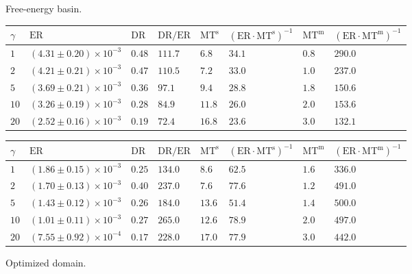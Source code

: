 \documentclass[a4]{article}
\newcommand{\DR}{\mathrm{DR}}
\newcommand{\ER}{\mathrm{ER}}
\newcommand{\MT}{\mathrm{MT}}
\newcommand{\1}{\mathbbm 1}
\begin{document}
\begin{figure}[ht]
  \centering
  \small
  \begin{subtable}{0.9\textwidth}
    \centering
    \caption{Free-energy basin.}
    \begin{tabular}{l|lllllll}
      \hline
      $\gamma$ & $\ER$ & $\DR$ &  $\DR/\ER$ & $\MT^{\mathrm{s}}$ & $(\ER\cdot\MT^{\mathrm{s}})^{-1}$ & $\MT^{\mathrm{m}}$  & $(\ER\cdot\MT^{\mathrm{m}})^{-1}$ \\
      \hline
$1$ & $(4.31 \pm 0.20) \times 10^{-3}$ & $0.48$ & $111.7$ & $6.8$ & $34.1$ & $0.8$ & $290.0$ \\
$2$ & $(4.21 \pm 0.21) \times 10^{-3}$ & $0.47$ & $110.5$ & $7.2$ & $33.0$ & $1.0$ & $237.0$ \\
$5$ & $(3.69 \pm 0.21) \times 10^{-3}$ & $0.36$ & $97.1$ & $9.4$ & $28.8$ & $1.8$ & $150.6$ \\
$10$ & $(3.26 \pm 0.19) \times 10^{-3}$ & $0.28$ & $84.9$ & $11.8$ & $26.0$ & $2.0$ & $153.6$ \\
$20$ & $(2.52 \pm 0.16) \times 10^{-3}$ & $0.19$ & $72.4$ & $16.8$ & $23.6$ & $3.0$ & $132.1$ \\
      \hline
    \end{tabular}
    \label{tab:free_energy_basin}
  \end{subtable}
  \hfill
  \begin{subtable}{0.9\textwidth}
    \centering
    \caption{Optimized domain.}
    \begin{tabular}{l|lllllll}
      \hline
      $\gamma$ & $\ER$ & $\DR$ &  $\DR/\ER$ & $\MT^{\mathrm{s}}$ & $(\ER\cdot\MT^{\mathrm{s}})^{-1}$ & $\MT^{\mathrm{m}}$  & $(\ER\cdot\MT^{\mathrm{m}})^{-1}$ \\
      \hline
$1$ & $(1.86 \pm 0.15) \times 10^{-3}$ & $0.25$ & $134.0$ & $8.6$ & $62.5$ & $1.6$ & $336.0$ \\
$2$ & $(1.70 \pm 0.13) \times 10^{-3}$ & $0.40$ & $237.0$ & $7.6$ & $77.6$ & $1.2$ & $491.0$ \\
$5$ & $(1.43 \pm 0.12) \times 10^{-3}$ & $0.26$ & $184.0$ & $13.6$ & $51.4$ & $1.4$ & $500.0$ \\
$10$ & $(1.01 \pm 0.11) \times 10^{-3}$ & $0.27$ & $265.0$ & $12.6$ & $78.9$ & $2.0$ & $497.0$ \\
$20$ & $(7.55 \pm 0.92) \times 10^{-4}$ & $0.17$ & $228.0$ & $17.0$ & $77.9$ & $3.0$ & $442.0$ \\
      \hline
    \end{tabular}
    \label{tab:optimized_state}
  \end{subtable}


\end{figure}
\end{document}
